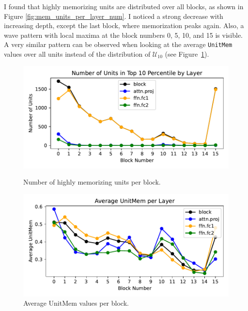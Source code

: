 \documentclass{article} %
\begin{document}
I found that highly memorizing units are distributed over all blocks, as shown in Figure \ref{fig:mem_units_per_layer_num}.
I noticed a strong decrease with increasing depth, except the last block, where memorization peaks again.
Also, a wave pattern with local maxima at the block numbers 0, 5, 10, and 15 is visible.
A very similar pattern can be observed when looking at the average \texttt{UnitMem} values over all units instead of the distribution of $\mathcal{U}_{10}$ (see Figure~\ref{fig:mem_avg_per_layer_num}).
\begin{figure}[ht]
   \centering
   \begin{minipage}{0.48\textwidth}
      \centering
      \includegraphics[width=\textwidth]{figures/mem_units_per_layer_num.pdf}
      \caption{Number of highly memorizing units per block.}
      \label{fig:mem_units_per_layer_num}
   \end{minipage}\hfill
   \begin{minipage}{0.48\textwidth}
      \centering
      \includegraphics[width=\textwidth]{figures/mem_avg_per_layer_num.pdf}
      \caption{Average UnitMem values per block.}
      \label{fig:mem_avg_per_layer_num}
   \end{minipage}
\end{figure}
\end{document}
